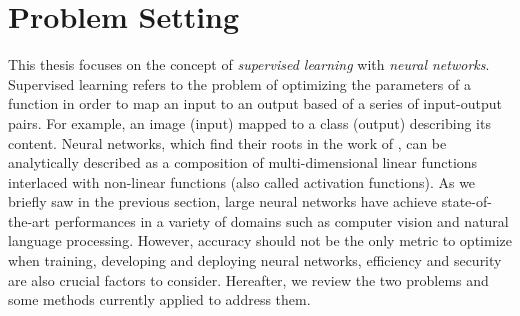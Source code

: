 \section{Problem Setting}
\label{section:ch1-problem_setting}

This thesis focuses on the concept of \emph{supervised learning} with \emph{neural networks}. 
Supervised learning refers to the problem of optimizing the parameters of a function in order to map an input to an output based of a series of input-output pairs.
For example, an image (input) mapped to a class (output) describing its content.
Neural networks, which find their roots in the work of \citet{mcculloch1943logical,rosenblatt1958perceptron}, can be analytically described as a composition of multi-dimensional linear functions interlaced with non-linear functions (also called activation functions).
As we briefly saw in the previous section, large neural networks have achieve state-of-the-art performances in a variety of domains such as computer vision and natural language processing.
However, accuracy should not be the only metric to optimize when training, developing and deploying neural networks, efficiency and security are also crucial factors to consider.
Hereafter, we review the two problems and some methods currently applied to address them. 





